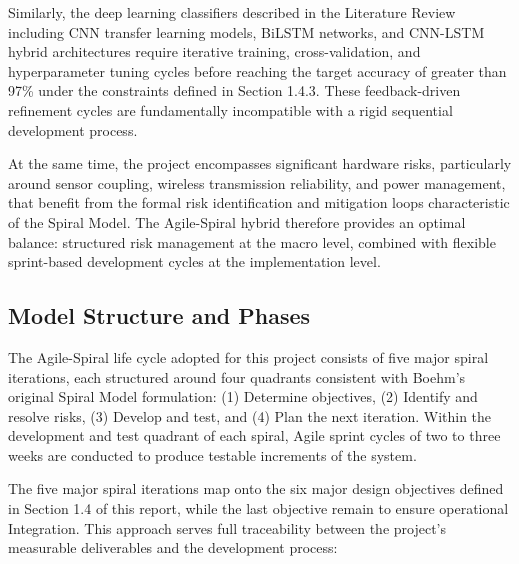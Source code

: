 \documentclass[12pt,a4paper,oneside]{memoir}
\begin{document}
Similarly, the deep learning classifiers described in the Literature Review including CNN transfer learning models, BiLSTM networks, and CNN-LSTM hybrid architectures require iterative training, cross-validation, and hyperparameter tuning cycles before reaching the target accuracy of greater than 97\% under the constraints defined in Section 1.4.3. These feedback-driven refinement cycles are fundamentally incompatible with a rigid sequential development process.

At the same time, the project encompasses significant hardware risks, particularly around sensor coupling, wireless transmission reliability, and power management, that benefit from the formal risk identification and mitigation loops characteristic of the Spiral Model. The Agile-Spiral hybrid therefore provides an optimal balance: structured risk management at the macro level, combined with flexible sprint-based development cycles at the implementation level.

\subsection{Model Structure and Phases}

The Agile-Spiral life cycle adopted for this project consists of five major spiral iterations, each structured around four quadrants consistent with Boehm's original Spiral Model formulation: (1) Determine objectives, (2) Identify and resolve risks, (3) Develop and test, and (4) Plan the next iteration. Within the development and test quadrant of each spiral, Agile sprint cycles of two to three weeks are conducted to produce testable increments of the system.

The five major spiral iterations map onto the six major design objectives defined in Section 1.4 of this report, while the last objective remain to ensure operational Integration. This approach serves full traceability between the project’s measurable deliverables and the development process:
\end{document}
